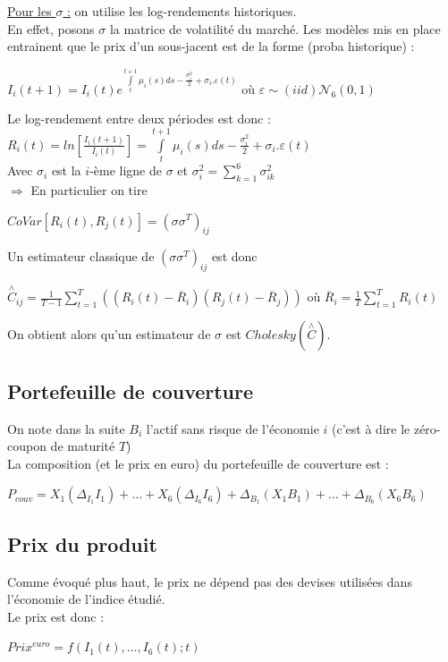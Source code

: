 \documentclass[a4paper,12pt]{article}
\begin{document}
\underline{Pour les $\sigma$ :} on utilise les log-rendements historiques. \\
En effet, posons $\sigma$ la matrice de volatilité du marché. Les modèles mis en place entrainent que le prix d'un sous-jacent est de la forme (proba historique) : 
\begin{center}
$I_i(t+1)=I_i(t)e^{\int\limits_t^{t+1}\mu_i(s)ds - \frac{\sigma_i^2}{2} + \sigma_i.\varepsilon(t)}$ où $\varepsilon\sim(iid)\mathcal{N}_6(0,1)$
\end{center}
Le log-rendement entre deux périodes est donc : $R_i(t)=ln\left[\frac{I_i(t+1)}{I_i(t)}\right] = \int\limits_t^{t+1}\mu_i(s)ds - \frac{\sigma_i^2}{2} + \sigma_i.\varepsilon(t)$ \\[2mm]
Avec $\sigma_i$ est la $i$-ème ligne de $\sigma$ et $\sigma_i^2=\sum\limits_{k=1}^6\sigma_{ik}^2$ \\[2mm]
$\Rightarrow$ En particulier on tire 
\begin{center}
$CoVar[R_i(t),R_j(t)] = (\sigma\sigma^T)_{ij}$
\end{center}
\newpage
Un estimateur classique de $(\sigma\sigma^T)_{ij}$ est donc
\begin{center}
 $\overset{\wedge}{C}_{ij}=\frac{1}{T-1}\sum\limits_{t=1}^T\left(\left(R_i(t)-\overline{R}_i\right)\left(R_j(t)-\overline{R}_j\right)\right)$ où $\overline{R}_i=\frac{1}{T}\sum\limits_{t=1}^TR_i(t)$
 \end{center}
 On obtient alors qu'un estimateur de $\sigma$ est $Cholesky(\overset{\wedge}{C})$.
\subsection{Portefeuille de couverture}
On note dans la suite $B_i$ l'actif sans risque de l'économie $i$ (c'est à dire le zéro-coupon de maturité $T$) \\[1mm]
La composition (et le prix en euro) du portefeuille de couverture est : 
\begin{center}
$P_{couv}=X_1(\Delta_{I_1}I_1)+\ldots+X_6(\Delta_{I_6}I_6)+\Delta_{B_1}(X_1B_1)+\ldots+\Delta_{B_6}(X_6B_6)$
\end{center}
\subsection{Prix du produit}
Comme évoqué plus haut, le prix ne dépend pas des devises utilisées dans l'économie de l'indice étudié. \\
Le prix est donc : 
\begin{center}
$Prix^{euro}=f(I_1(t),\ldots,I_6(t);t)$
\end{center}
\end{document}
